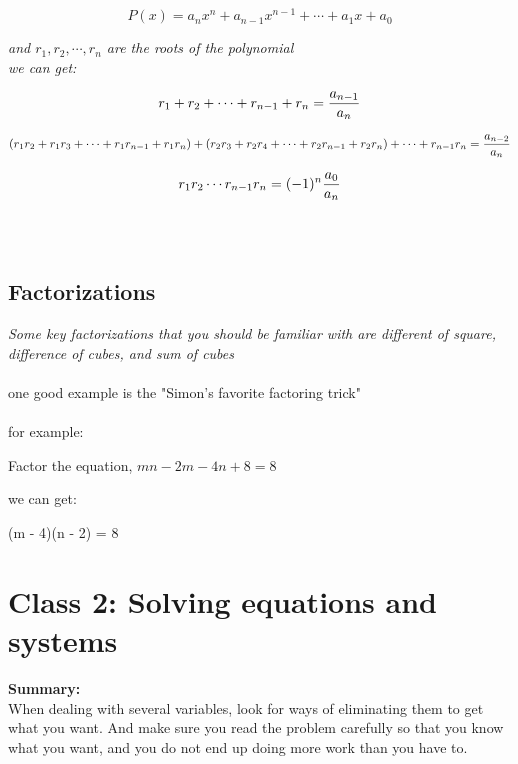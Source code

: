 \documentclass[10pt]{article}
\theoremstyle{remark}
\begin{document}
\begin{equation}
	P(x) = a_n{x^n} + a_{n - 1}{x^{n-1}} + \cdots + a_1x + a_0
\end{equation}

\textit{and $r_1, r_2, \cdots, r_n$ are the roots of the polynomial}
\\
\textit{we can get:}

\begin{equation}
	r_1 + r_2 + \cdots + r_{n - 1} + r_n = {a_{n - 1} \over a_n} \\
\end{equation}

\begin{equation}
	(r_1r_2 + r_1r_3 + \cdots + r_1r_{n-1} + r_1r_n) + (r_2r_3 + r_2r_4 + \cdots + r_2r_{n-1} + r_2r_n) + \cdots + r_{n - 1}r_n  = {a_{n - 2} \over a_n}
\end{equation}

\begin{equation}
	r_1r_2\cdots r_{n-1}r_n = {(-1)^n{a_0 \over a_n}}
\end{equation}
\\\\

\subsection{Factorizations}
\textit{Some key factorizations that you should be familiar with are different of square, difference of cubes, and sum of cubes}
\\\\

one good example is the "Simon's favorite factoring trick"
\\\\
for example:
\\
\begin{center}
Factor the equation, $mn - 2m - 4n + 8 = 8$
\end{center}

we can get:
\begin{center}
	(m - 4)(n - 2) = 8
\end{center}

\newpage

\section{Class 2: Solving equations and systems}
\begin{center}
	\textbf{Summary:}	
	\\
	When dealing with several variables, look for ways of eliminating them to get what you want. And make sure you read the problem carefully so that you know what you want,
	and you do not end up doing more work than you have to. 
\end{center}
\end{document}
